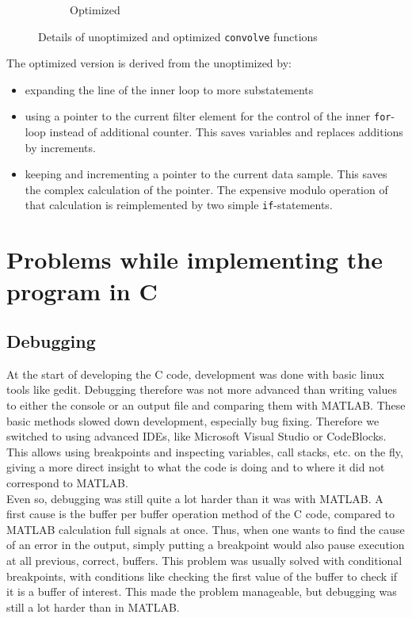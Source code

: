 \documentclass[a4paper]{article}
\begin{document}
\begin{figure}[htpb]
{\begin{subfigure}[c]{.7\textwidth}
\caption{Optimized}
\end{subfigure}
}
\caption{Details of unoptimized and optimized \texttt{convolve} functions}
\label{fig:convolvefunctions}
\end{figure}
\begin{minipage}{\textwidth}
The optimized version is derived from the unoptimized by:
\begin{itemize}
\item expanding the line of the inner loop to more substatements
\item using a pointer to the current filter element for the control of the inner \texttt{for}-loop instead of additional counter. This saves variables and replaces additions by increments.
\item keeping and incrementing a pointer to the current data sample. This saves the complex calculation of the pointer. The expensive modulo operation of that calculation is reimplemented by two simple \texttt{if}-statements.
\end{itemize}
\end{minipage}
\section{Problems while implementing the program in C}
\subsection{Debugging}
At the start of developing the C code, development was done with basic linux tools like gedit. Debugging therefore was not more advanced than writing values to either the console or an output file and comparing them with MATLAB. These basic methods slowed down development, especially bug fixing. Therefore we switched to using advanced IDEs, like Microsoft Visual Studio or CodeBlocks. This allows using breakpoints and inspecting variables, call stacks, etc. on the fly, giving a more direct insight to what the code is doing and to where it did not correspond to MATLAB. \\

Even so, debugging was still quite a lot harder than it was with MATLAB. A first cause is the buffer per buffer operation method of the C code, compared to MATLAB calculation full signals at once. Thus, when one wants to find the cause of an error in the output, simply putting a breakpoint would also pause execution at all previous, correct, buffers. This problem was usually solved with conditional breakpoints, with conditions like checking the first value of the buffer to check if it is a buffer of interest. This made the problem manageable, but debugging was still a lot harder than in MATLAB.\\
\end{document}
